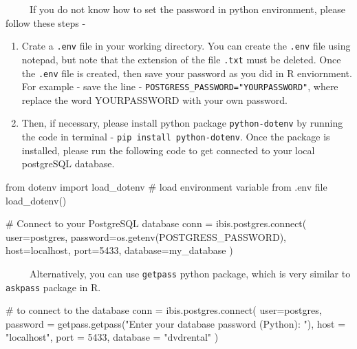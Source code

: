 \documentclass[
  letterpaper,
  DIV=11,
  numbers=noendperiod]{scrreprt}
\newenvironment{Shaded}{\begin{snugshade}}{\end{snugshade}}
\newcommand{\CommentTok}[1]{\textcolor[rgb]{0.37,0.37,0.37}{#1}}
\newcommand{\DecValTok}[1]{\textcolor[rgb]{0.68,0.00,0.00}{#1}}
\newcommand{\ExtensionTok}[1]{\textcolor[rgb]{0.00,0.23,0.31}{#1}}
\newcommand{\ImportTok}[1]{\textcolor[rgb]{0.00,0.46,0.62}{#1}}
\newcommand{\NormalTok}[1]{\textcolor[rgb]{0.00,0.23,0.31}{#1}}
\newcommand{\OperatorTok}[1]{\textcolor[rgb]{0.37,0.37,0.37}{#1}}
\newcommand{\StringTok}[1]{\textcolor[rgb]{0.13,0.47,0.30}{#1}}
\begin{document}
~~~~~If you do not know how to set the password in python environment,
please follow these steps -

\begin{enumerate}
\def\labelenumi{\arabic{enumi}.}
\item
  Crate a \texttt{.env} file in your working directory. You can create
  the \texttt{.env} file using notepad, but note that the extension of
  the file \texttt{.txt} must be deleted. Once the \texttt{.env} file is
  created, then save your password as you did in R enviornment. For
  example - save the line - \texttt{POSTGRESS\_PASSWORD="YOURPASSWORD"},
  where replace the word YOURPASSWORD with your own password.
\item
  Then, if necessary, please install python package
  \texttt{python-dotenv} by running the code in terminal -
  \texttt{pip\ install\ python-dotenv}. Once the package is installed,
  please run the following code to get connected to your local
  postgreSQL database.
\end{enumerate}

\begin{Shaded}
\begin{Highlighting}[]
\ImportTok{from}\NormalTok{ dotenv }\ImportTok{import}\NormalTok{ load\_dotenv}
\CommentTok{\# load environment variable from .env file }
\NormalTok{load\_dotenv()}

\CommentTok{\# Connect to your PostgreSQL database }
\NormalTok{conn }\OperatorTok{=}\NormalTok{ ibis.postgres.}\ExtensionTok{connect}\NormalTok{(}
\NormalTok{    user}\OperatorTok{=}\StringTok{\textquotesingle{}postgres\textquotesingle{}}\NormalTok{,}
\NormalTok{    password}\OperatorTok{=}\NormalTok{os.getenv(}\StringTok{\textquotesingle{}POSTGRESS\_PASSWORD\textquotesingle{}}\NormalTok{),}
\NormalTok{    host}\OperatorTok{=}\StringTok{\textquotesingle{}localhost\textquotesingle{}}\NormalTok{,}
\NormalTok{    port}\OperatorTok{=}\DecValTok{5433}\NormalTok{,}
\NormalTok{    database}\OperatorTok{=}\StringTok{\textquotesingle{}my\_database\textquotesingle{}}
\NormalTok{)}
\end{Highlighting}
\end{Shaded}

~~~~~Alternatively, you can use \texttt{getpass} python package, which
is very similar to \texttt{askpass} package in R.

\begin{Shaded}
\begin{Highlighting}[]
\CommentTok{\# to connect to the database }
\NormalTok{conn }\OperatorTok{=}\NormalTok{ ibis.postgres.}\ExtensionTok{connect}\NormalTok{(}
\NormalTok{    user}\OperatorTok{=}\StringTok{\textquotesingle{}postgres\textquotesingle{}}\NormalTok{, }
\NormalTok{    password }\OperatorTok{=}\NormalTok{ getpass.getpass(}\StringTok{"Enter your database password (Python): "}\NormalTok{),}
\NormalTok{    host }\OperatorTok{=} \StringTok{"localhost"}\NormalTok{,}
\NormalTok{    port }\OperatorTok{=} \DecValTok{5433}\NormalTok{,}
\NormalTok{    database }\OperatorTok{=} \StringTok{"dvdrental"}
\NormalTok{)}
\end{Highlighting}
\end{Shaded}
\end{document}
